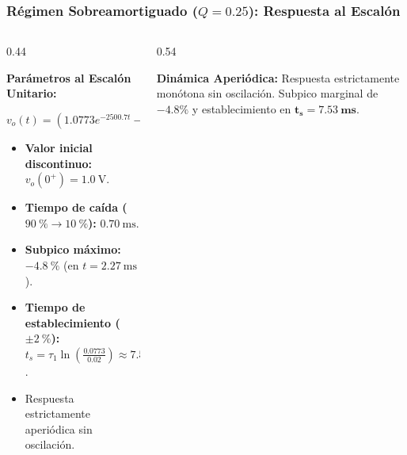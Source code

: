 \begin{frame}
  \frametitle{Régimen Sobreamortiguado ($Q = 0.25$): Respuesta al Escalón}

  \begin{columns}[c, onlytextwidth]
    \begin{column}{0.44\textwidth}
      \begin{tarjeta}
        {\fontsize{9pt}{11pt}\selectfont \textbf{\color{NavyDark} Parámetros al Escalón Unitario:}}\\[2pt]
        {\fontsize{7.5pt}{9.2pt}\selectfont
        \[ v_o(t) = (1.0773 e^{-2500.7 t} - 0.0773 e^{-179.5 t}) u(t) \]
        \begin{itemize}\setlength{\itemsep}{2pt}
          \item \textbf{Valor inicial discontinuo:} $v_o(0^+) = \qty{1.0}{\volt}$.
          \item \textbf{Tiempo de caída ($\qty{90}{\percent}\to\qty{10}{\percent}$):} $\qty{0.70}{\milli\second}$.
          \item \textbf{Subpico máximo:} $\qty{-4.8}{\percent}$ (en $t = \qty{2.27}{\milli\second}$).
          \item \textbf{Tiempo de establecimiento ($\pm\qty{2}{\percent}$):}
          $t_s = \tau_1 \ln\left(\frac{0.0773}{0.02}\right) \approx \mathbf{\qty{7.53}{\milli\second}}$.
          \item Respuesta estrictamente aperiódica sin oscilación.
        \end{itemize}
        }
      \end{tarjeta}
    \end{column}

    \begin{column}{0.54\textwidth}
      \centering
      \vspace{3pt}
      \begin{tarjeta}[colframe=CardBorder, colback=CardBg, boxrule=0.5pt, top=3pt, bottom=3pt, left=5pt, right=5pt]
        {\fontsize{7.5pt}{9pt}\selectfont
        \textbf{\color{NavyDark} Dinámica Aperiódica:} Respuesta estrictamente monótona sin oscilación. Subpico marginal de $\mathbf{-4.8\%}$ y establecimiento en $\mathbf{t_s = \qty{7.53}{\milli\second}}$.
        }
      \end{tarjeta}
    \end{column}
  \end{columns}
\end{frame}

